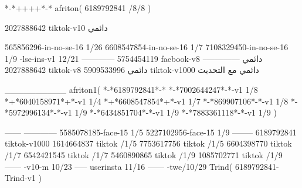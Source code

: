 *-*++++*-*
afriton(
6189792841 /8/8
)

2027888642 tiktok-v10
دائمي

565856296-in-no-se-16 1/26
6608547854-in-no-se-16 1/7
7108329450-in-no-se-16 1/9
-lse-ins-v1 12/21
------------
5754454119 facbook-v8
دائمي
--------------
2027888642 tiktok-v8
دائمي
5909533996 tiktok-v1000
دائمي مع التحديث

__________
afriton1(
*-*6189792841*-*
*-*7002644247*-*-v1 1/8
*+*6040158971*+*-v1 1/4
*+*6608547854*+*-v1 1/7
*-*869907106*-*-v1 1/8
*-*5972996134*-*-v1 1/9
*-*6434851704*-*-v1 1/9
*-*7883361118*-*-v1 1/9
)

------
------------
5585078185-face-15 1/5
5227102956-face-15 1/9
--------
6189792841 tiktok-v1000
1614664837 tiktok /1/5
7753617756 tiktok /1/5
6604398770 tiktok /1/7
6542421545 tiktok /1/7
5460890865 tiktok /1/9
1085702771 tiktok /1/9
------
-v10-m 10/23
-----
userinsta 11/16
------
-twe/10/29
Trind(
6189792841-Trind-v1 
)
